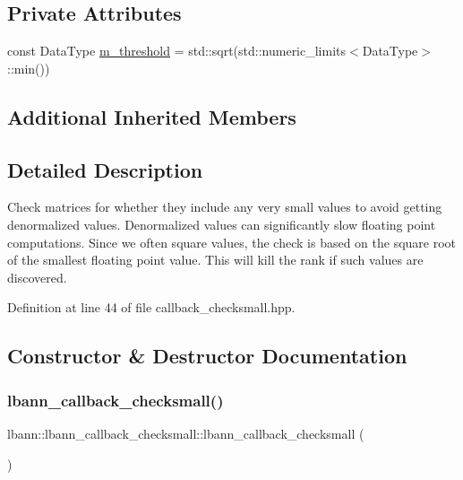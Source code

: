 \subsection*{Private Attributes}
\begin{DoxyCompactItemize}
\item 
const Data\+Type \hyperlink{classlbann_1_1lbann__callback__checksmall_a2c37cd93bca10f6fb42348c2e6b0016e}{m\+\_\+threshold} = std\+::sqrt(std\+::numeric\+\_\+limits$<$Data\+Type$>$\+::min())
\end{DoxyCompactItemize}
\subsection*{Additional Inherited Members}


\subsection{Detailed Description}
Check matrices for whether they include any very small values to avoid getting denormalized values. Denormalized values can significantly slow floating point computations. Since we often square values, the check is based on the square root of the smallest floating point value. This will kill the rank if such values are discovered. 

Definition at line 44 of file callback\+\_\+checksmall.\+hpp.



\subsection{Constructor \& Destructor Documentation}
\mbox{\label{classlbann_1_1lbann__callback__checksmall_a2a5769a9309807f6952212d5ea3a4466}} 
\subsubsection{\texorpdfstring{lbann\+\_\+callback\+\_\+checksmall()}{lbann\_callback\_checksmall()}\hspace{0.1cm}{\footnotesize\ttfamily [1/2]}}
{\footnotesize\ttfamily lbann\+::lbann\+\_\+callback\+\_\+checksmall\+::lbann\+\_\+callback\+\_\+checksmall (\begin{DoxyParamCaption}{ }\end{DoxyParamCaption})\hspace{0.3cm}{\ttfamily [inline]}}



